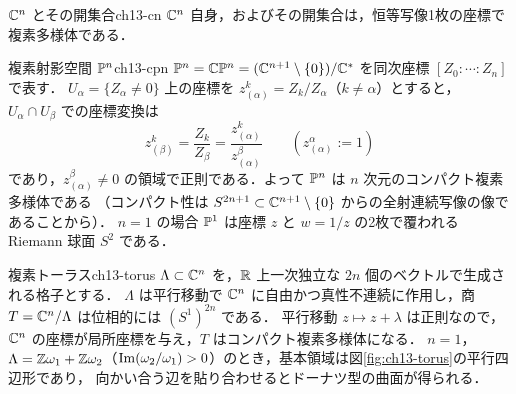 \begin{myex}{$\mathbb{C}^n$ とその開集合}{ch13-cn}
$\mathbb{C}^n$ 自身，およびその開集合は，恒等写像1枚の座標で複素多様体である．
\end{myex}

\begin{myex}{複素射影空間 $\mathbb{P}^n$}{ch13-cpn}
$\mathbb{P}^n=\mathbb{C}\mathbb{P}^n = (\mathbb{C}^{n+1}\setminus\{0\})/\mathbb{C}^*$ を同次座標 $[Z_0:\cdots:Z_n]$ で表す．
$U_\alpha=\{Z_\alpha\neq0\}$ 上の座標を $z_{(\alpha)}^{k}=Z_k/Z_\alpha$（$k\neq\alpha$）とすると，
$U_\alpha\cap U_\beta$ での座標変換は
\begin{equation}
  z_{(\beta)}^k = \frac{Z_k}{Z_\beta} = \frac{z^k_{(\alpha)}}{z^\beta_{(\alpha)}}\qquad(z^\alpha_{(\alpha)}:=1)
\end{equation}
であり，$z^\beta_{(\alpha)}\neq0$ の領域で正則である．よって $\mathbb{P}^n$ は $n$ 次元のコンパクト複素多様体である
（コンパクト性は $S^{2n+1}\subset\mathbb{C}^{n+1}\setminus\{0\}$ からの全射連続写像の像であることから）．
$n=1$ の場合 $\mathbb{P}^1$ は座標 $z$ と $w=1/z$ の2枚で覆われる Riemann 球面 $S^2$ である．
\end{myex}

\begin{myex}{複素トーラス}{ch13-torus}
$\Lambda\subset\mathbb{C}^n$ を，$\mathbb{R}$ 上一次独立な $2n$ 個のベクトルで生成される格子とする．
$\Lambda$ は平行移動で $\mathbb{C}^n$ に自由かつ真性不連続に作用し，商 $T=\mathbb{C}^n/\Lambda$ は位相的には $(S^1)^{2n}$ である．
平行移動 $z\mapsto z+\lambda$ は正則なので，$\mathbb{C}^n$ の座標が局所座標を与え，$T$ はコンパクト複素多様体になる．
$n=1$，$\Lambda=\mathbb{Z}\omega_1+\mathbb{Z}\omega_2$（$\operatorname{Im}(\omega_2/\omega_1)>0$）のとき，基本領域は図\ref{fig:ch13-torus}の平行四辺形であり，
向かい合う辺を貼り合わせるとドーナツ型の曲面が得られる．
\end{myex}

